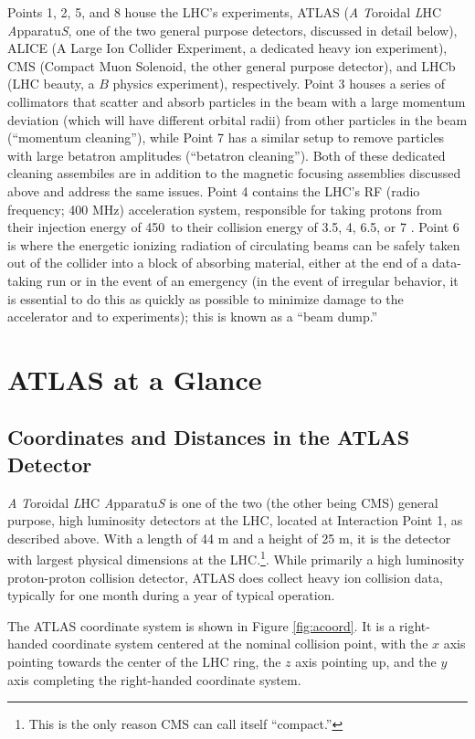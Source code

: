 Points 1, 2, 5, and 8 house the LHC's experiments, ATLAS (\emph{A} \emph{T}oroidal \emph{L}HC \emph{A}pparatu\emph{S}, one of the two general purpose detectors, discussed in detail below), ALICE (A Large Ion Collider Experiment, a dedicated heavy ion experiment), CMS (Compact Muon Solenoid, the other general purpose detector), and LHCb (LHC beauty, a $B$ physics experiment), respectively.  Point 3 houses a series of collimators that scatter and absorb particles in the beam with a large momentum deviation (which will have different orbital radii) from other particles in the beam (``momentum cleaning''), while Point 7 has a similar setup to remove particles with large betatron amplitudes (``betatron cleaning'').  Both of these dedicated cleaning assembiles are in addition to the magnetic focusing assemblies discussed above and address the same issues.  Point 4 contains the LHC's RF (radio frequency; 400 MHz) acceleration system, responsible for taking protons from their injection energy of 450 \GeV\,to their collision energy of 3.5, 4, 6.5, or 7 \TeV.  Point 6 is where the energetic ionizing radiation of circulating beams can be safely taken out of the collider into a block of absorbing material, either at the end of a data-taking run or in the event of an emergency (in the event of irregular behavior, it is essential to do this as quickly as possible to minimize damage to the accelerator and to experiments); this is known as a ``beam dump.''

\section{ATLAS at a Glance}
\subsection{Coordinates and Distances in the ATLAS Detector}
\emph{A} \emph{T}oroidal \emph{L}HC \emph{A}pparatu\emph{S} is one of the two (the other being CMS) general purpose, high luminosity detectors at the LHC, located at Interaction Point 1, as described above.  With a length of 44 m and a height of 25 m, it is the detector with largest physical dimensions at the LHC.\footnote{This is the only reason CMS can call itself ``compact.''}.  While primarily a high luminosity proton-proton collision detector, ATLAS does collect heavy ion collision data, typically for one month during a year of typical operation.  

The ATLAS coordinate system is shown in Figure \ref{fig:acoord}.  It is a right-handed coordinate system centered at the nominal collision point, with the $x$ axis pointing towards the center of the LHC ring, the $z$ axis pointing up, and the $y$ axis completing the right-handed coordinate system.

